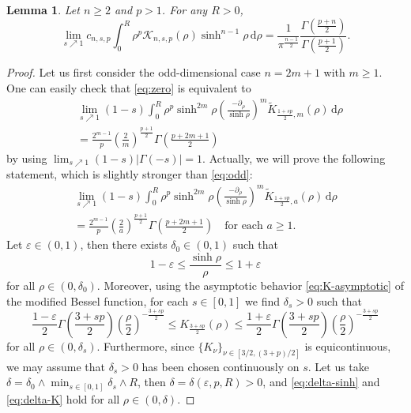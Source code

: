\documentclass[10pt,a4paper]{amsart}
\newtheorem{lemma}{Lemma}
\begin{document}
\begin{lemma} \label{lem:zero}
Let $n\geq 2$ and $p > 1$. For any $R > 0$,
\begin{equation} \label{eq:zero}
\lim_{s \nearrow 1} c_{n, s, p} \int_{0}^{R} \rho^{p} \mathcal{K}_{n,s,p}(\rho)\sinh^{n-1}\rho \,\mathrm{d}\rho = \frac{1}{\pi^{\frac{n-1}{2}}} \frac{\Gamma(\frac{p+n}{2})}{\Gamma(\frac{p+1}{2})}.
\end{equation}
\end{lemma}

\begin{proof}
Let us first consider the odd-dimensional case $n=2m+1$ with $m \geq 1$. One can easily check that \eqref{eq:zero} is equivalent to
\begin{equation} \label{eq:odd}
\begin{split}
&\lim_{s \nearrow 1} (1-s) \int_{0}^{R} \rho^{p} \sinh^{2m} \rho \left( \frac{-\partial_{\rho}}{\sinh \rho} \right)^{m} \widetilde{K}_{\frac{1+sp}{2},m}(\rho) \, \mathrm{d}\rho \\
&= \frac{2^{m-1}}{p} \left( \frac{2}{m} \right)^{\frac{p+1}{2}} \Gamma\left( \frac{p+2m+1}{2} \right)
\end{split}
\end{equation}
by using $\lim_{s \nearrow 1} (1-s)|\Gamma(-s)| = 1$. Actually, we will prove the following statement, which is slightly stronger than \eqref{eq:odd}:
\begin{equation} \label{eq:zero-odd}
\begin{split}
\lim_{s \nearrow 1} (1-s) \int_{0}^{R} \rho^{p} \sinh^{2m} \rho \left( \frac{-\partial_{\rho}}{\sinh \rho} \right)^{m} \widetilde{K}_{\frac{1+sp}{2},a}(\rho) \, \mathrm{d}\rho \\
= \frac{2^{m-1}}{p} \left( \frac{2}{a} \right)^{\frac{p+1}{2}} \Gamma\left( \frac{p+2m+1}{2} \right) \quad\text{for each } a \geq 1.
\end{split}
\end{equation}
Let $\varepsilon \in (0,1)$, then there exists $\delta_{0} \in (0,1)$ such that
\begin{equation} \label{eq:delta-sinh}
1-\varepsilon \leq \frac{\sinh \rho}{\rho} \leq 1+\varepsilon
\end{equation}
for all $\rho \in (0, \delta_{0})$. Moreover, using the asymptotic behavior \eqref{eq:K-asymptotic} of the modified Bessel function, for each $s \in [0,1]$ we find $\delta_{s} > 0$ such that
\begin{equation} \label{eq:delta-K}
\frac{1-\varepsilon}{2} \Gamma\left( \frac{3+sp}{2} \right)\left( \frac{\rho}{2} \right)^{-\frac{3+sp}{2}} \leq K_{\frac{3+sp}{2}}(\rho) \leq \frac{1+\varepsilon}{2} \Gamma\left( \frac{3+sp}{2} \right)\left( \frac{\rho}{2} \right)^{-\frac{3+sp}{2}}
\end{equation}
for all $\rho \in (0, \delta_{s})$. Furthermore, since $\{K_{\nu}\}_{\nu \in [3/2, (3+p)/2]}$ is equicontinuous, we may assume that $\delta_{s}>0$ has been chosen continuously on $s$. Let us take $\delta = \delta_{0} \land \min_{s \in [0,1]} \delta_{s} \land R$, then $\delta = \delta(\varepsilon, p, R) > 0$, and \eqref{eq:delta-sinh} and \eqref{eq:delta-K} hold for all $\rho \in (0, \delta)$.


\end{proof}
\end{document}
